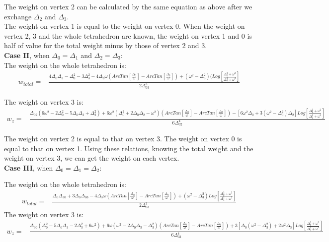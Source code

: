 \documentclass[10pt]{article}
\begin{document}
The weight on vertex 2 can be calculated by the same equation as above after we exchange $\Delta_2$ and $\Delta_3$.\\

The weight on vertex 1 is equal to the weight on vertex 0. When the weight on vertex 2, 3 and the whole tetrahedron are known, the weight on vertex 1 and 0 is half of value for the total weight minus by those of vertex 2 and 3. \\

\textbf{Case II}, when $\Delta_0=\Delta_1$ and $\Delta_2=\Delta_3$:\\

The weight on the whole tetrahedron is:
\begin{eqnarray}\label{wtti3a}
w_{total}=&\frac{4\Delta_0\Delta_3-\Delta_{0}^2-3\Delta_{3}^2-4\Delta_{3}\omega(ArcTan[\frac{\Delta_0}{\omega}]-ArcTan[\frac{\Delta_3}{\omega}])+(\omega^2-\Delta_3^2)(Log[\frac{\Delta_0^2+\omega^2}{\Delta_3^2+\omega^2}]}{2\Delta_{03}^3}
\end{eqnarray}

The weight on vertex 3 is:
\begin{eqnarray}\label{wtti3az}
w_{z}=&\frac{\Delta_{02}(6\omega^2-2\Delta_0^2-5\Delta_0\Delta_2+\Delta_2^2)+6\omega^2(\Delta_0^2+2\Delta_0\Delta_2-\omega^2)(ArcTan[\frac{\Delta_0}{\omega}]-ArcTan[\frac{\Delta_2}{\omega}])-[6\omega^2\Delta_0+3(\omega^2-\Delta_0^2)\Delta_2]Log[\frac{\Delta_0^2+\omega^2}{\Delta_2^2+\omega^2}]}{6\Delta_{02}^4}
\end{eqnarray}

The weight on vertex 2 is equal to that on vertex 3. The weight on vertex 0 is equal to that on vertex 1. Using these relations, knowing the total weight and the weight on vertex 3, we can get the weight on each vertex. \\

\textbf{Case III}, when $\Delta_0=\Delta_1=\Delta_2$:

The weight on the whole tetrahedron is:
\begin{eqnarray}\label{wtti4a}
w_{total}=&\frac{\Delta_0\Delta_{30}+3\Delta_3\Delta_{03}-4\Delta_3\omega(ArcTan[\frac{\Delta_0}{\omega}]-ArcTan[\frac{\Delta_3}{\omega}])+(\omega^2-\Delta_{3}^2)Log[\frac{\Delta_0^2+\omega^2}{\Delta_3^2+\omega^2}]}{2\Delta_{03}^3}
\end{eqnarray}
The weight on vertex 3 is:
\begin{eqnarray}\label{wtti4az}
w_{z}=&\frac{\Delta_{30}(\Delta_0^2-5\Delta_0\Delta_3-2\Delta_3^2+6\omega^2)+6\omega(\omega^2-2\Delta_0\Delta_3-\Delta_3^2)(ArcTan[\frac{\Delta_0}{\omega}]-ArcTan[\frac{\Delta_3}{\omega}])+3[\Delta_0(\omega^2-\Delta_3^2)+2\omega^2\Delta_3]Log[\frac{\Delta_0^2+\omega^2}{\Delta_3^2+\omega^2}]}{6\Delta_{03}^4}
\end{eqnarray}
\end{document}
